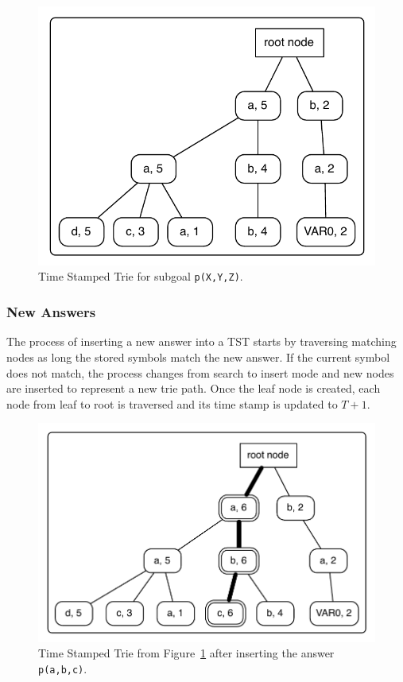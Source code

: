 \begin{figure}[ht]
  \centering
    \includegraphics[scale=0.6]{tst_1.pdf}
  \caption{Time Stamped Trie for subgoal \texttt{p(X,Y,Z)}.}
  \label{fig:tst_1}
\end{figure}

\subsubsection{New Answers}

The process of inserting a new answer into a TST starts by traversing matching nodes as long the stored symbols
match the new answer. If the current symbol does not match, the process changes from search to insert mode and
new nodes are inserted to represent a new trie path. Once the leaf node is created, each node from leaf to root
is traversed and its time stamp is updated to $T + 1$.

\begin{figure}[ht]
  \centering
    \includegraphics[scale=0.6]{tst_2.pdf}
  \caption{Time Stamped Trie from Figure~\ref{fig:tst_1} after inserting the answer \texttt{p(a,b,c)}.}
  \label{fig:tst_2}
\end{figure}

